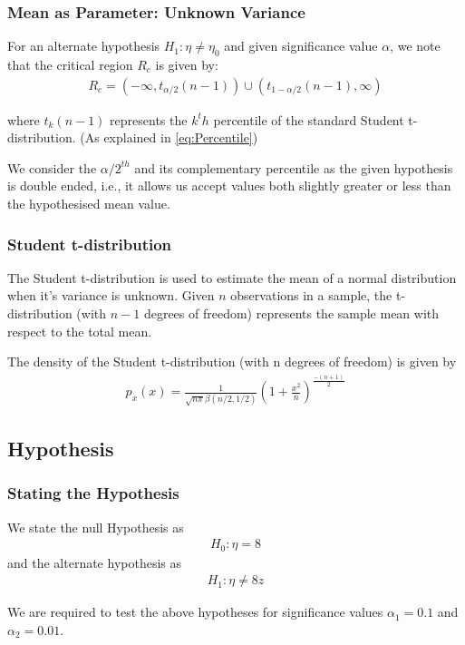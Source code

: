\documentclass{beamer}
\begin{document}
\begin{frame}
	\frametitle{Mean as Parameter: Unknown Variance}
	For an alternate hypothesis $H_1: \eta \neq \eta_0$ and given significance value $\alpha$, we note that the critical region $R_c$ is given by:
	\begin{align}
		R_c = (-\infty, t_{\alpha/2}(n - 1)) \cup (t_{1-\alpha/2}(n - 1), \infty)
		\label{eq:CriticalReg}
	\end{align}

	where $t_k(n - 1)$ represents the $k^th$ percentile of the standard Student t-distribution. (As explained in \eqref{eq:Percentile})

	We consider the $\alpha/2^{th}$ and its complementary percentile as the given hypothesis is double ended, i.e., it allows us accept values both slightly greater or less than the hypothesised mean value.

\end{frame}

\begin{frame}
	\frametitle{Student t-distribution}
	The Student t-distribution is used to estimate the mean of a normal distribution when it's variance is unknown. Given $n$ observations in a sample, the t-distribution (with $n - 1$ degrees of freedom) represents the sample mean with respect to the total mean.

	The density of the Student t-distribution (with n degrees of freedom) is given by
	\begin{align}
		p_x(x) = \frac{1}{\sqrt{n\pi}\beta(n/2, 1/2)}(1 + \frac{x^2}{n})^\frac{-(n+1)}{2}
	\end{align}
\end{frame}

\subsection{Hypothesis}
\begin{frame}
	\frametitle{Stating the Hypothesis}
	We state the null Hypothesis as
	\begin{align}
		H_0 : \eta = 8
		\label{eq:NullHyp}
	\end{align}
	and the alternate hypothesis as
	\begin{align}
		H_1 : \eta \neq 8z
		\label{eq:AltHyp}
	\end{align}

	We are required to test the above hypotheses for significance values $\alpha_1 = 0.1$ and $\alpha_2 = 0.01$.
\end{frame}
\end{document}
